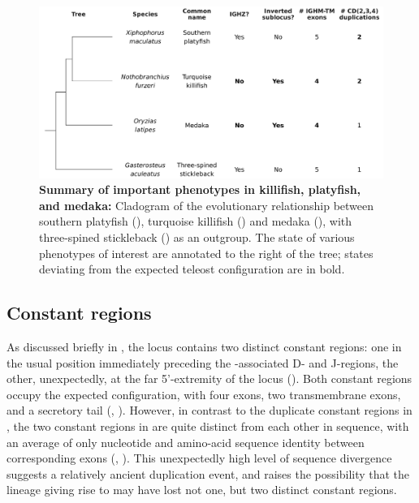 \begin{figure}
\centering
\includegraphics[width=\textwidth]{_Figures/png/species-tree-small}
\vspace{0.5em}
\caption[Summary of important \igh{} phenotypes in killifish, platyfish, and medaka]{\textbf{Summary of important \igh{} phenotypes in killifish, platyfish, and medaka:} Cladogram of the evolutionary relationship between southern platyfish (\xma), turquoise killifish (\nfu) and medaka (), with three-spined stickleback () as an outgroup. The state of various \igh{} phenotypes of interest are annotated to the right of the tree; states deviating from the expected teleost configuration are in bold.}
\label{fig:species-tree-small}
\end{figure}
	
\subsection{Constant regions}
\label{sec:xma-locus-constant}
	
As discussed briefly in , the \Xma \igh{} locus contains two distinct  constant regions: one in the usual position immediately preceding the -associated D- and J-regions, the other, unexpectedly, at the far 5'-extremity of the locus (). Both  constant regions occupy the expected configuration, with four \cz{} exons, two transmembrane exons, and a secretory tail (, ). However, in contrast to the duplicate constant regions in \Nfu, the two  constant regions in \Xma are quite distinct from each other in sequence, with an average of only  nucleotide and  amino-acid sequence identity between corresponding \cz{} exons (, ). This unexpectedly high level of sequence divergence suggests a relatively ancient duplication event, and raises the possibility that the lineage giving rise to \Nfu may have lost not one, but two distinct  constant regions.
	

